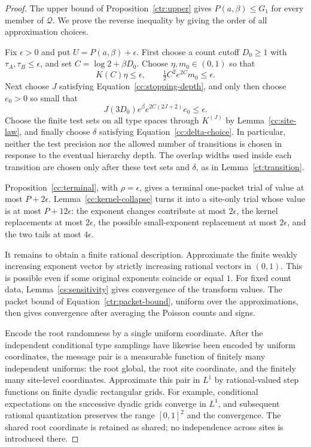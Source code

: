 \begin{proof}
The upper bound of Proposition~\ref{ctr:upper} gives
$P(a,\beta)\le G_1$ for every member of $\mathcal Q$.  We prove the
reverse inequality by giving the order of all approximation choices.

Fix $\epsilon>0$ and put $U=P(a,\beta)+\epsilon$.  First choose a
count cutoff $D_0\ge1$ with $\tau_A,\tau_B\le\epsilon$, and set
$C=\log2+\beta D_0$.  Choose $\eta,m_0\in(0,1)$ so that
\[
 K(C)\eta\le\epsilon,\qquad
 \tfrac12 C^2e^{2C}m_0\le\epsilon.
\]
Next choose $J$ satisfying Equation~\eqref{cc:stopping-depth}, and
only then choose $e_0>0$ so small that
\[
 J(3D_0)e^\beta e^{2C(2J+2)}e_0\le\epsilon.
\]
Choose the finite test sets on all type spaces through $K^{(J)}$ by
Lemma~\ref{cc:site-law}, and finally choose $\delta$ satisfying
Equation~\eqref{cc:delta-choice}.  In particular, neither the test
precision nor the allowed number of transitions is chosen in response
to the eventual hierarchy depth.  The overlap widths used inside each
transition are chosen only after these test sets and $\delta$, as in
Lemma~\ref{ct:transition}.

Proposition~\ref{cc:terminal}, with $\rho=\epsilon$, gives a
terminal one-packet trial of value at most $P+2\epsilon$.
Lemma~\ref{cc:kernel-collapse} turns it into a site-only trial whose
value is at most $P+12\epsilon$: the exponent changes contribute at
most $2\epsilon$, the kernel replacements at most $2\epsilon$, the
possible small-exponent replacement at most $2\epsilon$, and the
two tails at most $4\epsilon$.

It remains to obtain a finite rational description.  Approximate the
finite weakly increasing exponent vector by strictly increasing
rational vectors in $(0,1)$.  This is possible even if some original
exponents coincide or equal $1$.  For fixed count data,
Lemma~\ref{cs:sensitivity} gives convergence of the
transform values.  The packet bound of
Equation~\eqref{ctr:packet-bound}, uniform over the approximations,
then gives convergence after averaging the Poisson counts and signs.

Encode the root randomness by a single uniform coordinate.  After the
independent conditional type samplings have likewise been encoded by
uniform coordinates, the message pair is a measurable function of
finitely many independent uniforms: the root global, the root site
coordinate, and the finitely many site-level coordinates.  Approximate
this pair in $L^1$ by rational-valued step functions on finite dyadic
rectangular grids.  For example, conditional expectations on the
successive dyadic grids converge in $L^1$, and subsequent rational
quantization preserves the range $[0,1]^2$ and the convergence.
The shared root coordinate is retained as shared; no independence
across sites is introduced there.


\end{proof}
